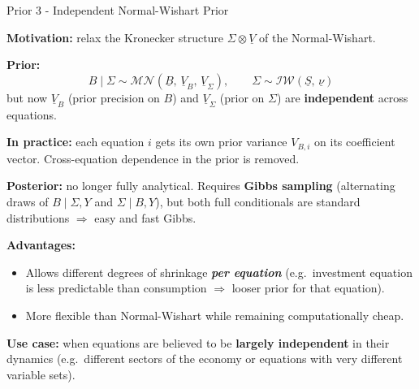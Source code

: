 \documentclass{beamer}
\begin{document}
\begin{frame}{Prior 3 - Independent Normal-Wishart Prior}
\footnotesize

\textbf{Motivation:} relax the Kronecker structure $\Sigma \otimes \underline{V}$ of the Normal-Wishart.

\medskip
\textbf{Prior:}
\[
B \mid \Sigma \sim \mathcal{MN}(\underline{B},\, \underline{V}_B,\, \underline{V}_\Sigma),
\qquad
\Sigma \sim \mathcal{IW}(\underline{S},\, \underline{\nu})
\]
but now $\underline{V}_B$ (prior precision on $B$) and $\underline{V}_\Sigma$ (prior on $\Sigma$) are \textbf{independent} across equations.

\medskip
\textbf{In practice:} each equation $i$ gets its own prior variance $V_{B,i}$ on its coefficient vector.
Cross-equation dependence in the prior is removed.

\medskip
\textbf{Posterior:} no longer fully analytical. Requires \textbf{Gibbs sampling} (alternating draws of $B \mid \Sigma, Y$ and $\Sigma \mid B, Y$), but both full conditionals are standard distributions $\Rightarrow$ easy and fast Gibbs.

\medskip
\textbf{Advantages:}
\begin{itemize}
  \item Allows different degrees of shrinkage \textbf{\emph{per equation}} (e.g.\ investment equation is less predictable than consumption $\Rightarrow$ looser prior for that equation).
  \item More flexible than Normal-Wishart while remaining computationally cheap.
\end{itemize}

\textbf{Use case:} when equations are believed to be \textbf{largely independent} in their dynamics
(e.g.\ different sectors of the economy or equations with very different variable sets).

\end{frame}
\end{document}
